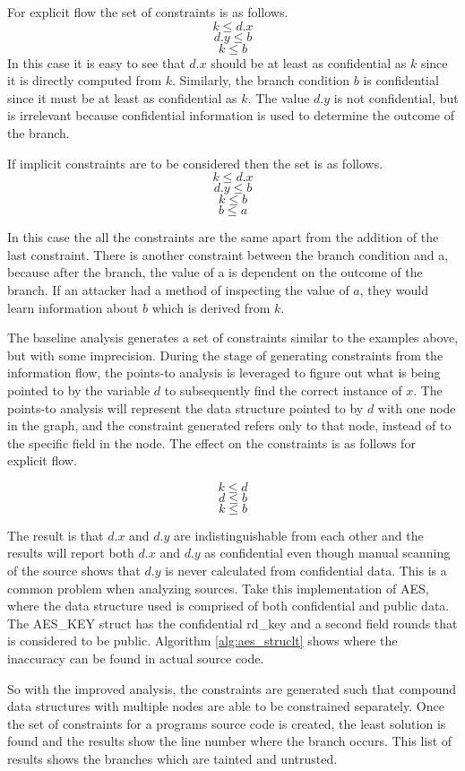 \documentclass[11pt,a4paper]{article}
\begin{document}
For explicit flow the set of constraints is as follows.
\[
  k \leq d.x
\]
\[
  d.y \leq b
\]
\[
  k \leq b
\]
In this case it is easy to see that $d.x$ should be at least as confidential as $k$
since it is directly computed from $k$. Similarly, the branch condition $b$ is
confidential since it must be at least as confidential as $k$. The value $d.y$
is not confidential, but is irrelevant because confidential information is used
to determine the outcome of the branch. 

If implicit constraints are to be considered then the set is as follows.
\[
  k \leq d.x
\]
\[
  d.y \leq b
\]
\[
  k \leq b
\]
\[
  b \leq a
\]

In this case the all the constraints are the same apart from the addition of the
last constraint. There is another constraint between the branch condition and a,
because after the branch, the value of a is dependent on the outcome of the
branch. If an attacker had a method of inspecting the value of $a$, they would
learn information about $b$ which is derived from $k$.

The baseline analysis generates a set of constraints similar to the examples
above, but with some imprecision. During the stage of generating constraints
from the information flow, the points-to analysis is leveraged to figure out
what is being pointed to by the variable $d$ to subsequently find the correct
instance of $x$. The points-to analysis will represent the data structure
pointed to by $d$ with one node in the graph, and the constraint generated
refers only to that node, instead of to the specific field in the node. The
effect on the constraints is as follows for explicit flow.

\[
  k \leq d
\]
\[
  d \leq b
\]
\[
  k \leq b
\]

The result is that $d.x$ and $d.y$ are indistinguishable from each other and the
results will report both $d.x$ and $d.y$ as confidential even though manual
scanning of the source shows that $d.y$ is never calculated from confidential
data. This is a common problem when analyzing sources. Take this implementation
of AES, where the data structure used is comprised of both confidential and
public data. The AES\_KEY struct has the confidential rd\_key and a second field
rounds that is considered to be public. Algorithm \ref{alg:aes_struclt} shows
where the inaccuracy can be found in actual source code.

So with the improved analysis, the constraints are generated such that compound
data structures with multiple nodes are able to be constrained separately. Once
the set of constraints for a programs source code is created, the least solution
is found and the results show the line number where the branch occurs. This list
of results shows the branches which are tainted and untrusted. 
\end{document}

